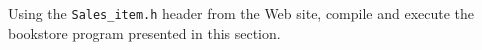%
%
\begin{question}\label{qst:compile and execute the bookstore program}
Using the \verb|Sales_item.h| header from the Web site,
compile and execute the bookstore program presented in this section.
\end{question}
